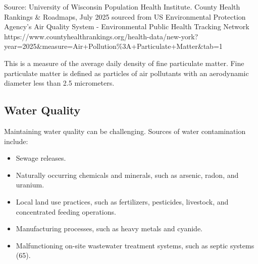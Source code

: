 \documentclass[
  english,
  letterpaper,
]{report}
\providecommand{\tightlist}{%
  \setlength{\itemsep}{0pt}\setlength{\parskip}{0pt}}
\begin{document}
\begin{tcolorbox}[enhanced jigsaw, breakable, leftrule=.75mm, title=\textcolor{quarto-callout-note-color}{\faInfo}\hspace{0.5em}{Source}, bottomrule=.15mm, opacityback=0, left=2mm, colback=white, bottomtitle=1mm, coltitle=black, colbacktitle=quarto-callout-note-color!10!white, colframe=quarto-callout-note-color-frame, opacitybacktitle=0.6, toptitle=1mm, titlerule=0mm, arc=.35mm, rightrule=.15mm, toprule=.15mm]

Source: University of Wisconsin Population Health Institute. County
Health Rankings \& Roadmaps, July 2025 sourced from US Environmental
Protection Agency's Air Quality System - Environmental Public Health
Tracking Network
https://www.countyhealthrankings.org/health-data/new-york?year=2025\&measure=Air+Pollution\%3A+Particulate+Matter\&tab=1

\end{tcolorbox}

\begin{tcolorbox}[enhanced jigsaw, breakable, leftrule=.75mm, title=\textcolor{quarto-callout-note-color}{\faInfo}\hspace{0.5em}{Note}, bottomrule=.15mm, opacityback=0, left=2mm, colback=white, bottomtitle=1mm, coltitle=black, colbacktitle=quarto-callout-note-color!10!white, colframe=quarto-callout-note-color-frame, opacitybacktitle=0.6, toptitle=1mm, titlerule=0mm, arc=.35mm, rightrule=.15mm, toprule=.15mm]

This is a measure of the average daily density of fine particulate
matter. Fine particulate matter is defined as particles of air
pollutants with an aerodynamic diameter less than 2.5 micrometers.

\end{tcolorbox}

\subsection{Water Quality}\label{water-quality}

Maintaining water quality can be challenging. Sources of water
contamination include:

\begin{itemize}
\tightlist
\item
  Sewage releases.
\item
  Naturally occurring chemicals and minerals, such as arsenic, radon,
  and uranium.
\item
  Local land use practices, such as fertilizers, pesticides, livestock,
  and concentrated feeding operations.
\item
  Manufacturing processes, such as heavy metals and cyanide.
\item
  Malfunctioning on-site wastewater treatment systems, such as septic
  systems (65).
\end{itemize}
\end{document}
